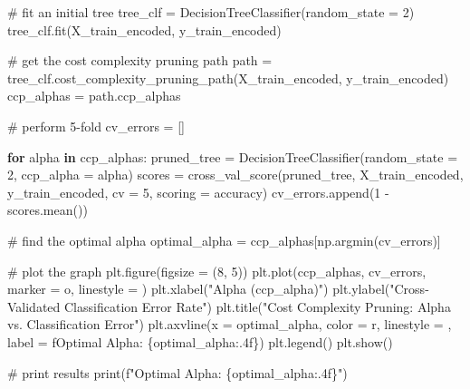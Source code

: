 \documentclass[
  letterpaper,
  DIV=11,
  numbers=noendperiod]{scrartcl}
\newenvironment{Shaded}{\begin{snugshade}}{\end{snugshade}}
\newcommand{\BuiltInTok}[1]{\textcolor[rgb]{0.00,0.23,0.31}{#1}}
\newcommand{\CommentTok}[1]{\textcolor[rgb]{0.37,0.37,0.37}{#1}}
\newcommand{\ControlFlowTok}[1]{\textcolor[rgb]{0.00,0.23,0.31}{\textbf{#1}}}
\newcommand{\DecValTok}[1]{\textcolor[rgb]{0.68,0.00,0.00}{#1}}
\newcommand{\KeywordTok}[1]{\textcolor[rgb]{0.00,0.23,0.31}{\textbf{#1}}}
\newcommand{\NormalTok}[1]{\textcolor[rgb]{0.00,0.23,0.31}{#1}}
\newcommand{\OperatorTok}[1]{\textcolor[rgb]{0.37,0.37,0.37}{#1}}
\newcommand{\SpecialCharTok}[1]{\textcolor[rgb]{0.37,0.37,0.37}{#1}}
\newcommand{\SpecialStringTok}[1]{\textcolor[rgb]{0.13,0.47,0.30}{#1}}
\newcommand{\StringTok}[1]{\textcolor[rgb]{0.13,0.47,0.30}{#1}}
\begin{document}
\begin{Shaded}
\begin{Highlighting}[]
\CommentTok{\# fit an initial tree }
\NormalTok{tree\_clf }\OperatorTok{=}\NormalTok{ DecisionTreeClassifier(random\_state }\OperatorTok{=} \DecValTok{2}\NormalTok{)}
\NormalTok{tree\_clf.fit(X\_train\_encoded, y\_train\_encoded)}

\CommentTok{\# get the cost complexity pruning path}
\NormalTok{path }\OperatorTok{=}\NormalTok{ tree\_clf.cost\_complexity\_pruning\_path(X\_train\_encoded, y\_train\_encoded)}
\NormalTok{ccp\_alphas }\OperatorTok{=}\NormalTok{ path.ccp\_alphas  }

\CommentTok{\# perform 5{-}fold }
\NormalTok{cv\_errors }\OperatorTok{=}\NormalTok{ []}

\ControlFlowTok{for}\NormalTok{ alpha }\KeywordTok{in}\NormalTok{ ccp\_alphas:}
\NormalTok{    pruned\_tree }\OperatorTok{=}\NormalTok{ DecisionTreeClassifier(random\_state }\OperatorTok{=} \DecValTok{2}\NormalTok{, ccp\_alpha }\OperatorTok{=}\NormalTok{ alpha)}
\NormalTok{    scores }\OperatorTok{=}\NormalTok{ cross\_val\_score(pruned\_tree, X\_train\_encoded, y\_train\_encoded, }
\NormalTok{                             cv }\OperatorTok{=} \DecValTok{5}\NormalTok{, scoring }\OperatorTok{=} \StringTok{\textquotesingle{}accuracy\textquotesingle{}}\NormalTok{)}
\NormalTok{    cv\_errors.append(}\DecValTok{1} \OperatorTok{{-}}\NormalTok{ scores.mean())  }

\CommentTok{\# find the optimal alpha }
\NormalTok{optimal\_alpha }\OperatorTok{=}\NormalTok{ ccp\_alphas[np.argmin(cv\_errors)]}

\CommentTok{\# plot the graph}
\NormalTok{plt.figure(figsize }\OperatorTok{=}\NormalTok{ (}\DecValTok{8}\NormalTok{, }\DecValTok{5}\NormalTok{))}
\NormalTok{plt.plot(ccp\_alphas, cv\_errors, marker }\OperatorTok{=} \StringTok{\textquotesingle{}o\textquotesingle{}}\NormalTok{, linestyle }\OperatorTok{=} \StringTok{\textquotesingle{}{-}\textquotesingle{}}\NormalTok{)}
\NormalTok{plt.xlabel(}\StringTok{"Alpha (ccp\_alpha)"}\NormalTok{)}
\NormalTok{plt.ylabel(}\StringTok{"Cross{-}Validated Classification Error Rate"}\NormalTok{)}
\NormalTok{plt.title(}\StringTok{"Cost Complexity Pruning: Alpha vs. Classification Error"}\NormalTok{)}
\NormalTok{plt.axvline(x }\OperatorTok{=}\NormalTok{ optimal\_alpha, color }\OperatorTok{=} \StringTok{\textquotesingle{}r\textquotesingle{}}\NormalTok{, linestyle }\OperatorTok{=} \StringTok{\textquotesingle{}{-}{-}\textquotesingle{}}\NormalTok{, label }\OperatorTok{=} \SpecialStringTok{f\textquotesingle{}Optimal Alpha: }\SpecialCharTok{\{}\NormalTok{optimal\_alpha}\SpecialCharTok{:.4f\}}\SpecialStringTok{\textquotesingle{}}\NormalTok{)}
\NormalTok{plt.legend()}
\NormalTok{plt.show()}

\CommentTok{\# print results}
\BuiltInTok{print}\NormalTok{(}\SpecialStringTok{f"Optimal Alpha: }\SpecialCharTok{\{}\NormalTok{optimal\_alpha}\SpecialCharTok{:.4f\}}\SpecialStringTok{"}\NormalTok{)}
\end{Highlighting}
\end{Shaded}
\end{document}
